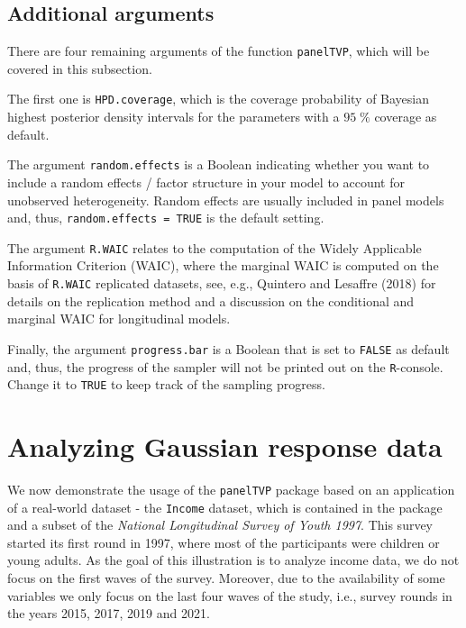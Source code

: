 \documentclass[a4paper, preprint, 3p,
authoryear]{elsarticle} %
\begin{document}
\subsection{Additional arguments}\label{additional-arguments}

There are four remaining arguments of the function \texttt{panelTVP},
which will be covered in this subsection.

The first one is \texttt{HPD.coverage}, which is the coverage
probability of Bayesian highest posterior density intervals for the
parameters with a \(95 \; \%\) coverage as default.

The argument \texttt{random.effects} is a Boolean indicating whether you
want to include a random effects / factor structure in your model to
account for unobserved heterogeneity. Random effects are usually
included in panel models and, thus, \texttt{random.effects = TRUE} is
the default setting.

The argument \texttt{R.WAIC} relates to the computation of the Widely
Applicable Information Criterion (WAIC), where the marginal WAIC is
computed on the basis of \texttt{R.WAIC} replicated datasets, see, e.g.,
Quintero and Lesaffre (2018) for details on the replication method and a
discussion on the conditional and marginal WAIC for longitudinal models.

Finally, the argument \texttt{progress.bar} is a Boolean that is set to
\texttt{FALSE} as default and, thus, the progress of the sampler will
not be printed out on the \texttt{R}-console. Change it to \texttt{TRUE}
to keep track of the sampling progress.

\section{Analyzing Gaussian response
data}\label{analyzing-gaussian-response-data}

We now demonstrate the usage of the \texttt{panelTVP} package based on
an application of a real-world dataset - the \texttt{Income} dataset,
which is contained in the package and a subset of the
\textit{National Longitudinal Survey of Youth 1997}. This survey started
its first round in 1997, where most of the participants were children or
young adults. As the goal of this illustration is to analyze income
data, we do not focus on the first waves of the survey. Moreover, due to
the availability of some variables we only focus on the last four waves
of the study, i.e., survey rounds in the years 2015, 2017, 2019 and
2021.
\end{document}
